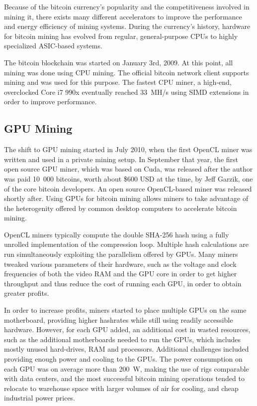 Because of the bitcoin currency's popularity and the competitiveness involved in mining it, there exists
many different accelerators to improve the performance and energy efficiency of mining systems.
During the currency's history, hardware for bitcoin mining has evolved from regular, general-purpose
CPUs to highly specialized ASIC-based systems.

The bitcoin blockchain was started on January 3rd, 2009. At this point, all mining was done
using CPU mining. The official bitcoin network client supports mining and was used for this
purpose. The fastest CPU miner, a high-end, overclocked Core i7 990x eventually reached 33~MH/s
using SIMD extensions in order to improve performance. \cite{bitcoin-history}

\subsection{GPU Mining}
The shift to GPU mining started in July 2010, when the first OpenCL miner was written and
used in a private mining setup. In September that year, the first open source GPU miner,
which was based on Cuda, was released after the author was paid 10~000 bitcoins, worth about
\$600 USD at the time, by Jeff Garzik, one of the core bitcoin developers. An open source
OpenCL-based miner was released shortly after. Using GPUs for bitcoin mining allows miners to
take advantage of the heterogenity offered by common desktop computers to accelerate bitcoin
mining. \cite{bitcoin-history}

OpenCL miners typically compute the double SHA-256 hash using a fully unrolled implementation
of the compression loop. Multiple hash calculations are run simultaneously exploiting the parallelism
offered by GPUs. Many miners tweaked various parameters of their hardware, such as the voltage and
clock frequencies of both the video RAM and the GPU core in order to get higher throughput
and thus reduce the cost of running each GPU, in order to obtain greater profits.

In order to increase profits, miners started to place multiple GPUs on the same motherboard,
providing higher hashrates while still using readily accessible hardware. However, for each
GPU added, an additional cost in wasted resources, such as the additional motherboards needed
to run the GPUs, which includes mostly unused hard-drives, RAM and processors.
Additional challenges included providing enough power and cooling to the GPUs.
The power consumption on each GPU was on average more than 200~W, making the use of rigs
comparable with data centers, and the most successful bitcoin mining operations tended to
relocate to warehouse space with larger volumes of air for cooling, and cheap industrial power prices. \cite{bespoke-silicon}

